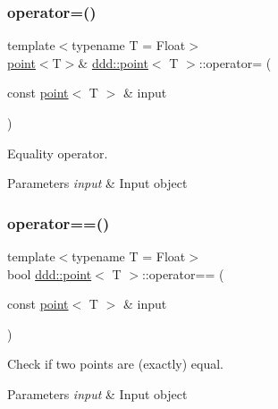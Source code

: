 \subsubsection{\texorpdfstring{operator=()}{operator=()}}
{\footnotesize\ttfamily template$<$typename T = Float$>$ \\
\hyperlink{classddd_1_1point}{point}$<$T$>$\& \hyperlink{classddd_1_1point}{ddd\+::point}$<$ T $>$\+::operator= (\begin{DoxyParamCaption}\item[{const \hyperlink{classddd_1_1point}{point}$<$ T $>$ \&}]{input }\end{DoxyParamCaption})\hspace{0.3cm}{\ttfamily [inline]}}



Equality operator. 


\begin{DoxyParams}{Parameters}
{\em input} & Input object \\
\hline
\end{DoxyParams}
\mbox{\label{classddd_1_1point_a98f8e8097257f053b85e1ee32352fda4}} 
\subsubsection{\texorpdfstring{operator==()}{operator==()}}
{\footnotesize\ttfamily template$<$typename T = Float$>$ \\
bool \hyperlink{classddd_1_1point}{ddd\+::point}$<$ T $>$\+::operator== (\begin{DoxyParamCaption}\item[{const \hyperlink{classddd_1_1point}{point}$<$ T $>$ \&}]{input }\end{DoxyParamCaption})\hspace{0.3cm}{\ttfamily [inline]}}



Check if two points are (exactly) equal. 


\begin{DoxyParams}{Parameters}
{\em input} & Input object \\
\hline
\end{DoxyParams}
\mbox{\label{classddd_1_1point_aabf1454e1f0496fb70c1e62852aa2595}} 
